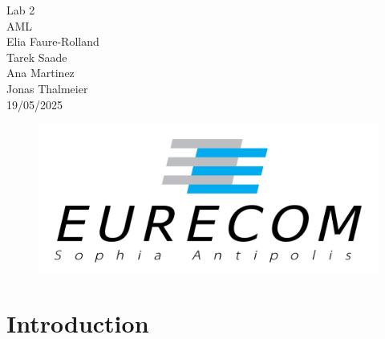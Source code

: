 \documentclass[ngerman]{scrartcl}
\begin{document}
\begin{titlepage}
\begin{center}
    \vspace{15cm}
    \huge{Lab 2}\\
    \vspace{2cm}
    \Huge{AML}\\
    \vspace{2cm}
    \Large{Elia Faure-Rolland}\\
    \Large{Tarek Saade}\\
    \Large{Ana Martinez}\\
    \Large{Jonas Thalmeier}\\
    \vspace{1cm}
    19/05/2025
\end{center}
\vspace{3cm}
\begin{figure}[h]
    \centering
    \includegraphics[width=.5\textwidth]{Figures/Eurecom.png}
\end{figure}
\end{titlepage}

\thispagestyle{empty}
\newpage
\setcounter{page}{1}

\section{Introduction}
\end{document}
